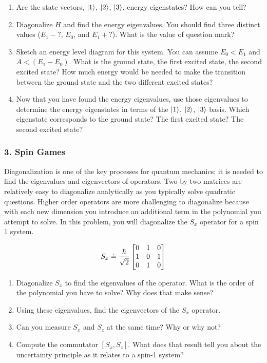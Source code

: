 \documentclass[
]{article}
\providecommand{\tightlist}{%
  \setlength{\itemsep}{0pt}\setlength{\parskip}{0pt}}
\providecommand{\tightlist}{%
  \setlength{\itemsep}{0pt}\setlength{\parskip}{0pt}}
\begin{document}
\begin{enumerate}
\def\labelenumi{\arabic{enumi}.}
\tightlist
\item
  Are the state vectors, \(\ket{1}\), \(\ket{2}\), \(\ket{3}\), energy
  eigenstates? How can you tell?
\item
  Diagonalize \(H\) and find the energy eigenvalues. You should find
  three distinct values (\(E_1 - ?\), \(E_0\), and \(E_1 + ?\)). What is
  the value of question mark?
\item
  Sketch an energy level diagram for this system. You can assume
  \(E_0 < E_1\) and \(A < (E_1-E_0)\). What is the ground state, the
  first excited state, the second excited state? How much energy would
  be needed to make the transition between the ground state and the two
  different excited states?
\item
  Now that you have found the energy eigenvalues, use those eigenvalues
  to determine the energy eigenstates in terms of the \(\ket{1}\),
  \(\ket{2}\), \(\ket{3}\) basis. Which eigenstate corresponds to the
  ground state? The first excited state? The second excited state?
\end{enumerate}

\hypertarget{spin-games}{%
\subsubsection{3. Spin Games}\label{spin-games}}

Diagonalization is one of the key processes for quantum mechanics; it is
needed to find the eigenvalues and eigenvectors of operators. Two by two
matrices are relatively easy to diagonalize analytically as you
typically solve quadratic questions. Higher order operators are more
challenging to diagonalize because with each new dimension you introduce
an additional term in the polynomial you attempt to solve. In this
problem, you will diagonalize the \(S_x\) operator for a spin 1 system.

\[S_x \doteq \dfrac{\hbar}{\sqrt{2}}\begin{bmatrix} 0 & 1 & 0 \cr 1 & 0 & 1 \cr 0 & 1 & 0 \end{bmatrix}\]

\begin{enumerate}
\def\labelenumi{\arabic{enumi}.}
\tightlist
\item
  Diagonalize \(S_x\) to find the eigenvalues of the operator. What is
  the order of the polynomial you have to solve? Why does that make
  sense?
\item
  Using these eigenvalues, find the eigenvectors of the \(S_x\)
  operator.
\item
  Can you measure \(S_x\) and \(S_z\) at the same time? Why or why not?
\item
  Compute the commutator \([S_x,S_z]\). What does that result tell you
  about the uncertainty principle as it relates to a spin-1 system?
\end{enumerate}
\end{document}
